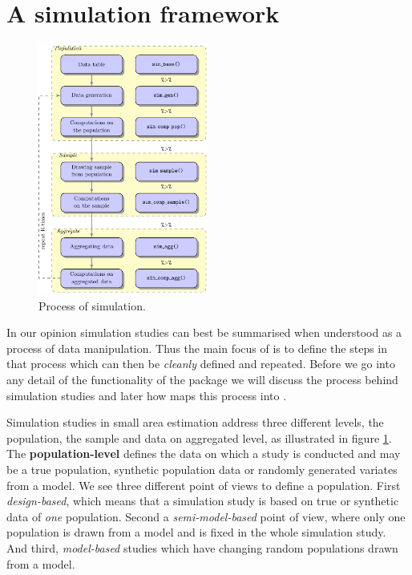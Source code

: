 \documentclass[article]{ajs}
\begin{document}
\section{A simulation framework}
\label{sec:framework}
%
\begin{figure}
\begin{center}
\includegraphics[width=0.5\textwidth]{flowdiagram}
\end{center}
\caption{\label{fig:flowdiagram}Process of simulation.} 
\end{figure}
%
In our opinion simulation studies can best be summarised when understood as a process of data manipulation. Thus the main focus of  is to define the steps in that process which can then be \textit{cleanly} defined and repeated. Before we go into any detail of the functionality of the package we will discuss the process behind simulation studies and later how  maps this process into .

Simulation studies in small area estimation address three different levels, the population, the sample and data on aggregated level, as illustrated in figure \ref{fig:flowdiagram}. The \textbf{population-level} defines the data on which a study is conducted and may be a true population, synthetic population data or randomly generated variates from a model. We see three different point of views to define a population. First \textit{design-based}, which means that a simulation study is based on true or synthetic data of \textit{one} population. Second a \textit{semi-model-based} point of view, where only one population is drawn from a model and is fixed in the whole simulation study. And third, \textit{model-based} studies which have changing random populations drawn from a model.
\end{document}
